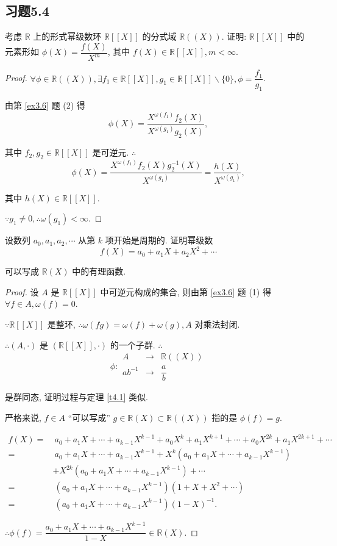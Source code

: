 \documentclass[UTF8]{ctexart}
\begin{document}
\subsection{习题5.4}
\begin{exercise}%
    考虑 $\mathbb{R}$ 上的形式幂级数环 $\mathbb{R}[[X]]$ 的分式域 $\mathbb{R}((X))$. 证明: $\mathbb{R}[[X]]$ 中的元素形如 $\phi(X)=\dfrac{f(X)}{X^m}$, 其中 $f(X)\in\mathbb{R}[[X]],m<\infty$.
\end{exercise}
\begin{proof}
    $\forall\phi\in\mathbb{R}((X)),\exists f_1\in\mathbb{R}[[X]],g_1\in\mathbb{R}[[X]]\backslash\{0\},\phi=\dfrac{f_1}{g_1}$.

    由第 \ref{ex3.6} 题 (2) 得
    \[\phi(X)=\dfrac{X^{\omega(f_1)}f_2(X)}{X^{\omega(g_1)}g_2(X)},\]

    其中 $f_2,g_2\in\mathbb{R}[[X]]$ 是可逆元. $\therefore$
    \[\phi(X)=\dfrac{X^{\omega(f_1)}f_2(X)g^{-1}_2(X)}{X^{\omega(g_1)}}=\dfrac{h(X)}{X^{\omega(g_1)}},\]

    其中 $h(X)\in\mathbb{R}[[X]]$.

    $\because g_1\neq0,\therefore\omega(g_1)<\infty$.
\end{proof}
\begin{exercise}%
    设数列 $a_0,a_1,a_2,\cdots$ 从第 $k$ 项开始是周期的. 证明幂级数
    \[f(X)=a_0+a_1X+a_2X^2+\cdots\]

    可以写成 $\mathbb{R}(X)$ 中的有理函数.
\end{exercise}
\begin{proof}
    设 $A$ 是 $\mathbb{R}[[X]]$ 中可逆元构成的集合, 则由第 \ref{ex3.6} 题 (1) 得 $\forall f\in A,\omega(f)=0$.

    $\because\mathbb{R}[[X]]$ 是整环, $\therefore\omega(fg)=\omega(f)+\omega(g),A$ 对乘法封闭.

    $\therefore(A,\cdot)$ 是 $(\mathbb{R}[[X]],\cdot)$ 的一个子群. $\therefore$
    \[\phi:\begin{array}{rcl}
        A & \to & \mathbb{R}((X)) \\
        ab^{-1} & \to & \dfrac{a}{b}
    \end{array}\]

    是群同态, 证明过程与定理 \ref{t4.1} 类似.

    严格来说, $f\in A$ ``可以写成'' $g\in\mathbb{R}(X)\subset\mathbb{R}((X))$ 指的是 $\phi(f)=g$.

    \begin{align*}
        f(X)= & \ a_0+a_1X+\cdots+a_{k-1}X^{k-1}+a_0X^k+a_1X^{k+1}+\cdots+a_0X^{2k}+a_1X^{2k+1}+\cdots \\
        = & \ a_0+a_1X+\cdots+a_{k-1}X^{k-1}+X^k(a_0+a_1X+\cdots+a_{k-1}X^{k-1}) \\
        & +X^{2k}(a_0+a_1X+\cdots+a_{k-1}X^{k-1})+\cdots \\
        = & \ (a_0+a_1X+\cdots+a_{k-1}X^{k-1})(1+X+X^2+\cdots) \\
        = & \ (a_0+a_1X+\cdots+a_{k-1}X^{k-1})(1-X)^{-1}.
    \end{align*}

    $\therefore\phi(f)=\dfrac{a_0+a_1X+\cdots+a_{k-1}X^{k-1}}{1-X}\in\mathbb{R}(X)$.
\end{proof}
\end{document}

